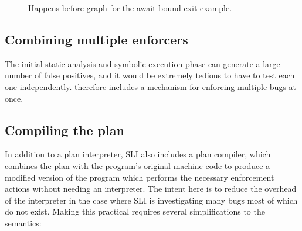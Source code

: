 \begin{figure}
\caption{Happens before graph for the await-bound-exit example.}
\label{fig:enforce:await_exit_hb}
\end{figure}

\subsection{Combining multiple enforcers}
\label{sect:enforce:combine_enforcers}

The initial static analysis and symbolic execution phase can generate
a large number of false positives, and it would be extremely tedious
to have to test each one independently.  {\Implementation} therefore
includes a mechanism for enforcing multiple bugs at once.


\subsection{Compiling the plan}
\label{sect:enforce:compiling}


In addition to a plan interpreter, SLI also includes a plan compiler, which combines the plan with the program's original machine code to produce a modified version of the program which performs the necessary enforcement actions without needing an interpreter.
The intent here is to reduce the overhead of the interpreter in the case where SLI is investigating many bugs most of which do not exist.
Making this practical requires several simplifications to the semantics:

